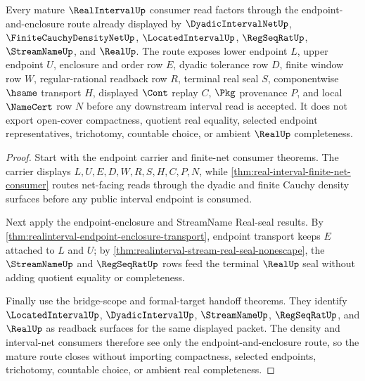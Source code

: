 \begin{theorem}
\label{thm:realinterval-mature-consumer-route}
Every mature $\RealIntervalUp$ consumer read factors through the endpoint-and-enclosure route already displayed by $\DyadicIntervalNetUp$, $\FiniteCauchyDensityNetUp$, $\LocatedIntervalUp$, $\RegSeqRatUp$, $\StreamNameUp$, and $\RealUp$. The route exposes lower endpoint $L$, upper endpoint $U$, enclosure and order row $E$, dyadic tolerance row $D$, finite window row $W$, regular-rational readback row $R$, terminal real seal $S$, componentwise $\hsame$ transport $H$, displayed $\Cont$ replay $C$, $\Pkg$ provenance $P$, and local $\NameCert$ row $N$ before any downstream interval read is accepted. It does not export open-cover compactness, quotient real equality, selected endpoint representatives, trichotomy, countable choice, or ambient $\RealUp$ completeness.
\end{theorem}
\begin{proof}
Start with the endpoint carrier and finite-net consumer theorems. The carrier displays $L,U,E,D,W,R,S,H,C,P,N$, while \autoref{thm:real-interval-finite-net-consumer} routes net-facing reads through the dyadic and finite Cauchy density surfaces before any public interval endpoint is consumed.

Next apply the endpoint-enclosure and StreamName Real-seal results. By \autoref{thm:realinterval-endpoint-enclosure-transport}, endpoint transport keeps $E$ attached to $L$ and $U$; by \autoref{thm:realinterval-stream-real-seal-nonescape}, the $\StreamNameUp$ and $\RegSeqRatUp$ rows feed the terminal $\RealUp$ seal without adding quotient equality or completeness.

Finally use the bridge-scope and formal-target handoff theorems. They identify $\LocatedIntervalUp$, $\DyadicIntervalUp$, $\StreamNameUp$, $\RegSeqRatUp$, and $\RealUp$ as readback surfaces for the same displayed packet. The density and interval-net consumers therefore see only the endpoint-and-enclosure route, so the mature route closes without importing compactness, selected endpoints, trichotomy, countable choice, or ambient real completeness.
\end{proof}


